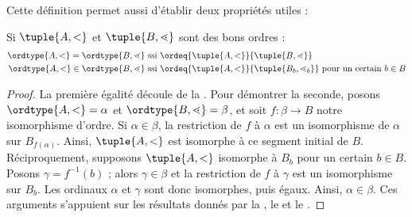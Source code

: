 \documentclass[../../../include/open-logic-section]{subfiles}
\begin{document}
Cette définition permet aussi d'établir deux propriétés utiles :

\begin{cor}
Si $\tuple{A, <}$ et $\tuple{B, \lessdot}$ sont des bons ordres :
\begin{align*}
	\ordtype{A, <} = \ordtype{B, \lessdot}&\text{ ssi }\ordeq{\tuple{A, <}}{\tuple{B, \lessdot}}\\
	\ordtype{A, <} \in \ordtype{B, \lessdot}&\text{ ssi }\ordeq{\tuple{A, <}}{\tuple{B_b, \lessdot_b}}\text{ pour un certain }b \in B
\end{align*}
\end{cor}

\begin{proof}
La première égalité découle de la . Pour
démontrer la seconde, posons $\ordtype{A, <} = \alpha$ et
$\ordtype{B, \lessdot} = \beta$, et soit $f \colon \beta \to B$
notre isomorphisme d'ordre.
Si $\alpha \in \beta$, la restriction de $f$ à $\alpha$ est un
isomorphisme de $\alpha$ sur $B_{f(\alpha)}$. Ainsi,
$\tuple{A, <}$ est isomorphe à ce segment initial de $B$.
Réciproquement, supposons $\tuple{A, <}$ isomorphe à $B_b$ pour
un certain $b \in B$. Posons $\gamma=f^{-1}(b)$ ; alors
$\gamma \in \beta$ et la restriction de $f$ à $\gamma$ est un
isomorphisme sur $B_b$. Les ordinaux $\alpha$ et $\gamma$ sont
donc isomorphes, puis égaux. Ainsi, $\alpha \in \beta$.
Ces arguments s'appuient sur les résultats donnés
par la ,
le  et le
.
\end{proof}
\end{document}
